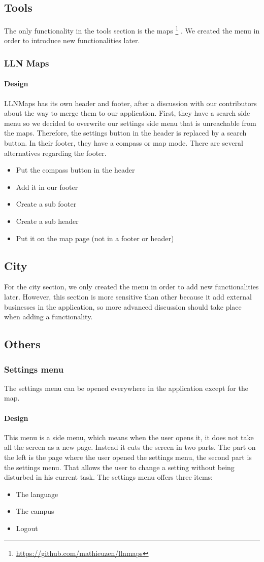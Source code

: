 \documentclass{eplmastersthesis}
\begin{document}
\subsection{Tools}
The only functionality in the tools section is the maps \footnote{\url{https://github.com/mathieuzen/llnmaps}} . We created the menu in order to introduce new functionalities later. 
\subsubsection{LLN Maps}
\paragraph{Design}
LLNMaps has its own header and footer, after a discussion with our contributors about the way to merge them to our application. First, they have a search side menu so we decided to overwrite our settings side menu that is unreachable from the maps. Therefore, the settings button in the header is replaced by a search button. In their footer, they have a compass or map mode. There are several alternatives regarding the footer.
\begin{itemize}
\item Put the compass button in the header
\item Add it in our footer
\item Create a sub footer
\item Create a sub header
\item Put it on the map page (not in a footer or header) 
\end{itemize}
\subsection{City}
For the city section, we only created the menu in order to add new functionalities later. However, this section is more sensitive than other because it add external businesses in the application, so more advanced discussion should take place when adding a functionality.
\subsection{Others}
\subsubsection{Settings menu}
The settings menu can be opened everywhere in the application except for the map.
\paragraph{Design}
This menu is a side menu, which means when the user opens it, it does not take all the screen as a new page. Instead it cuts the screen in two parts. The part on the left is the page where the user opened the settings menu, the second part is the settings menu. That allows the user to change a setting without being disturbed in his current task.
The settings menu offers three items:
\begin{itemize}
\item The language
\item The campus
\item Logout
\end{itemize}
\end{document}

